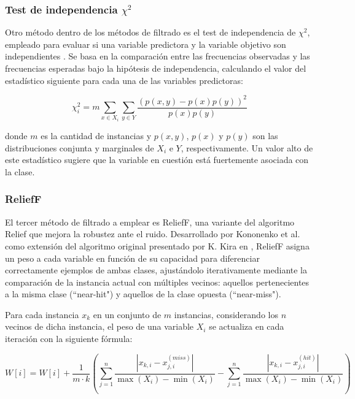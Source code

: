 \documentclass[a4paper,12pt]{article}
\begin{document}
\subsubsection{Test de independencia \(\chi^2\)}

Otro método dentro de los métodos de filtrado es el test de independencia de \(\chi^2\), empleado para evaluar si una variable predictora y la variable objetivo son independientes \cite{liu2012}. Se basa en la comparación entre las frecuencias observadas y las frecuencias esperadas bajo la hipótesis de independencia, calculando el valor del  estadístico siguiente para cada una de las variables predictoras:


\[
    \chi^2_{i} = m \sum_{x \in X_i} \sum_{y \in Y} \frac{( p(x,y) - p(x) p(y) )^2}{p(x) p(y)}
\]

\noindent
donde \( m \) es la cantidad de instancias y \( p(x,y) \), \( p(x) \) y \( p(y) \) son las distribuciones conjunta y marginales de \( X_i \) e \( Y \), respectivamente. Un valor alto de este estadístico sugiere que la variable en cuestión está fuertemente asociada con la clase.

\subsubsection{ReliefF}

El tercer método de filtrado a emplear es ReliefF, una variante del algoritmo Relief que mejora la robustez ante el ruido. Desarrollado por Kononenko et al. \cite{kononenko1996} como extensión del algoritmo original presentado por K. Kira en \cite{kira1992}, ReliefF asigna un peso a cada variable en función de su capacidad para diferenciar correctamente ejemplos de ambas clases, ajustándolo iterativamente mediante la comparación de la instancia actual con múltiples vecinos: aquellos pertenecientes a la misma clase (``near-hit") y aquellos de la clase opuesta (``near-miss").

Para cada instancia \(x_k\) en un conjunto de $m$ instancias, considerando los $n$ vecinos de dicha instancia, el peso de una variable \(X_i\) se actualiza en cada iteración con la siguiente fórmula:

\[
    W[i] = W[i] + \frac{1}{m \cdot k} \left( \sum_{j=1}^{n} \frac{|x_{k,i} - x_{j,i}^{(miss)}|}{\max(X_i) - \min(X_i)} -  \sum_{j=1}^{n} \frac{|x_{k,i} - x_{j,i}^{(hit)}|}{\max(X_i) - \min(X_i)} \right)
\]
\end{document}

